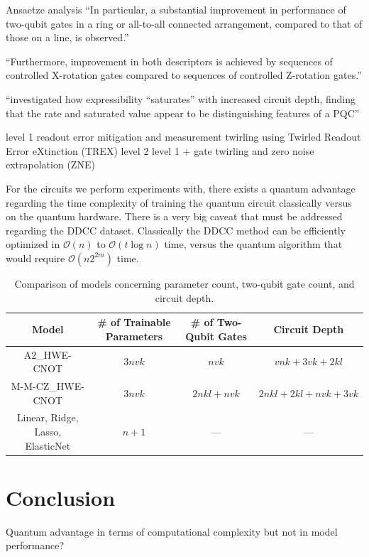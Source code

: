 \documentclass[journal=jacsat,manuscript=article]{achemso}
\begin{document}
Ansaetze analysis \cite{sim_expressibility_2019}
``In particular, a substantial improvement in performance of two-qubit gates in a ring or all-to-all connected arrangement, compared to that of those on a line, is observed.''

``Furthermore, improvement in both descriptors is achieved by sequences of controlled X-rotation gates compared to sequences of controlled Z-rotation gates.''

``investigated how expressibility “saturates” with increased circuit depth, finding that the rate and saturated value appear to be distinguishing features of a PQC''




level 1 readout error mitigation and measurement twirling using Twirled Readout Error eXtinction (TREX) \cite{van_den_berg_model-free_2022}
level 2 level 1 + gate twirling and zero noise extrapolation (ZNE)\cite{kandala_error_2019,li_efficient_2017,temme_error_2017}


For the circuits we perform experiments with, there exists a quantum advantage regarding the time complexity of training the quantum circuit classically versus on the quantum hardware. 
There is a very big caveat that must be addressed regarding the DDCC dataset.
Classically the DDCC method can be efficiently optimized in $\mathcal{O}(n)$ to $\mathcal{O}(t \log n)$ time, versus the quantum algorithm that would require $\mathcal{O}(n 2^{2m})$ time.

\begin{table}[h!]
	\centering
	\small
	\begin{tabular}{|c|c|c|c|}
		\hline
		\textbf{Model} & \textbf{\# of Trainable Parameters} & \textbf{\# of Two-Qubit Gates} & \textbf{Circuit Depth} \\
		\hline
		A2\_HWE-CNOT & \(3nvk\) & \(nvk\) & \(vnk + 3vk + 2kl\) \\
		\hline
		M-M-CZ\_HWE-CNOT & \(3nvk\) & \(2nkl + nvk\) & \(2nkl + 2kl + nvk + 3vk\) \\
		\hline
		Linear, Ridge, Lasso, ElasticNet & \(n + 1\) & --- & --- \\
		\hline
	\end{tabular}
	\caption{Comparison of models concerning parameter count, two-qubit gate count, and circuit depth.}
\end{table}

\section{Conclusion}
Quantum advantage in terms of computational complexity but not in model performance?
\end{document}
